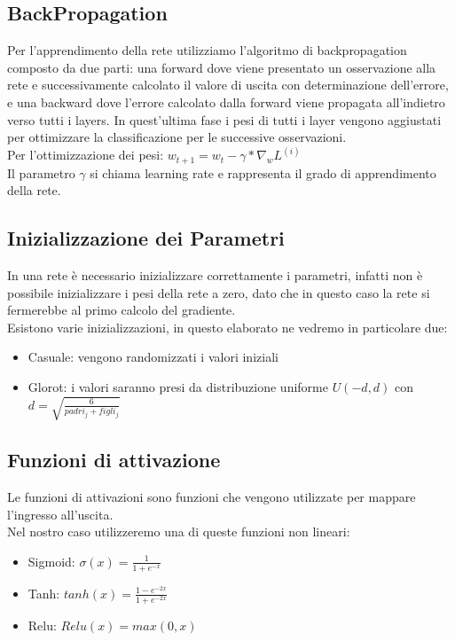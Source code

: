 \documentclass{article}
\begin{document}
        \subsection{BackPropagation}\label{subsec:backpropagation}
            Per l'apprendimento della rete utilizziamo l'algoritmo di backpropagation composto da due parti: una forward dove viene presentato un osservazione alla rete e successivamente calcolato il valore di uscita con determinazione dell'errore,
            e una backward dove l'errore calcolato dalla forward viene propagata all'indietro verso tutti i layers.
            In quest'ultima fase i pesi di tutti i layer vengono aggiustati per ottimizzare la classificazione per le successive osservazioni.\\
            Per l'ottimizzazione dei pesi: \begin{math} w_{t+1} = w_t - \gamma * \nabla_w L^{(i)}\end{math} \\
            Il parametro $\gamma$ si chiama learning rate e rappresenta il grado di apprendimento della rete.
        \subsection{Inizializzazione dei Parametri}\label{subsec:inizializzazione-dei-parametri}
            In una rete è necessario inizializzare correttamente i parametri, infatti non è possibile inizializzare i pesi della rete a zero,
            dato che in questo caso la rete si fermerebbe al primo calcolo del gradiente.\\
            Esistono varie inizializzazioni, in questo elaborato ne vedremo in particolare due:
            \begin{itemize}
                \item Casuale: vengono randomizzati i valori iniziali
                \item Glorot: i valori saranno presi da distribuzione uniforme $U(-d, d)$ con $d=\sqrt{\frac{6}{padri_j + figli_j}}$
            \end{itemize}
        \subsection{Funzioni di attivazione}\label{subsec:funzioni-di-attivazione}
            Le funzioni di attivazioni sono funzioni che vengono utilizzate per mappare l’ingresso all’uscita. \\
            Nel nostro caso utilizzeremo una di queste funzioni non lineari:
            \begin{itemize}
                \item Sigmoid: $\sigma(x) = \frac{1} {1 + e^{-x}}$
                \item Tanh: $tanh(x) = \frac{1 - e^{-2x}}{1 + e^{-2x}}$
                \item Relu: $Relu(x) = max(0, x)$
            \end{itemize}
\end{document}
